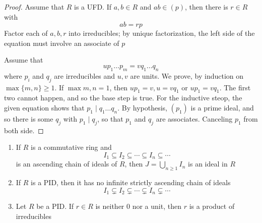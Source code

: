 \documentclass[11pt]{article}
\begin{document}
\begin{proof}
Assume that \(R\) is a UFD. If \(a,b\in R\) and \(ab\in(p)\), then there is
\(r\in R\) with
\begin{equation*}
ab=rp
\end{equation*}
Factor each of \(a,b,r\) into irreducibles; by unique factorization, the left
side of the equation must involve an associate of \(p\)

Assume that 
\begin{equation*}
up_1\dots p_m=vq_1\dots q_n
\end{equation*}
where \(p_i\) and \(q_j\) are irreducibles and \(u,v\) are units. We prove,
by induction on \(\max\{m,n\}\ge1\). If \(\max{m,n}=1\), then 
\(up_1=v,u=vq_1\) or \(up_1=vq_1\). The first two cannot happen, and so the
base step is true. For the inductive steop, the given equation shows that 
\(p_1\mid q_1\dots q_n\). By hypothesis, \((p_1)\) is a prime ideal, and so
there is some \(q_j\) with \(p_1\mid q_j\), so that \(p_1\) and \(q_j\) are
associates. Canceling \(p_1\) from both side.
\end{proof}

\begin{lemma}[]
\begin{enumerate}
\item If \(R\) is a commutative ring and
\begin{equation*}
I_1\subseteq I_2\subseteq\cdots\subseteq I_n\subseteq\cdots
\end{equation*}
is an ascending chain of ideals of \(R\), then \(J=\bigcup_{n\ge1}I_n\) is
an ideal in \(R\)
\item If \(R\) is a PID, then it has no infinite strictly ascending chain of
ideals 
\begin{equation*}
I_1\subsetneq I_2\subsetneq\cdots\subsetneq I_n\subsetneq\cdots
\end{equation*}
\item Let \(R\) be a PID. If \(r\in R\) is neither 0 nor a unit, then \(r\) is a
product of irreducibles
\end{enumerate}
\end{lemma}
\end{document}
